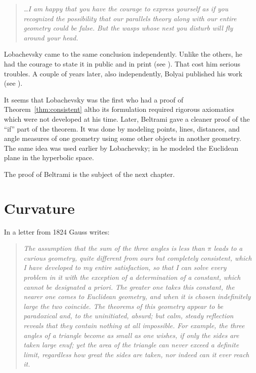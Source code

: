\smallskip

\begin{quotation}{\it
\dots I am happy that you have the courage to express yourself as if you recognized the possibility
that our parallels theory along with our entire geometry could be false. But the wasps whose
nest you disturb will fly around your head.}
\end{quotation}

\smallskip

Lobachevsky came to the same conclusion independently.
Unlike the others, he had the courage to state it in public and in print (see \cite{lobachevsky}).
That cost him serious troubles.
A couple of years later, also independently, Bolyai published his work (see \cite{bolyai}).

It seems that Lobachevsky was the first who had a proof of Theorem~\ref{thm:consistent} altho its formulation required rigorous axiomatics which were not developed at his time.
Later, Beltrami gave a cleaner proof of the ``if'' part of the theorem.
It was done by modeling points, lines, distances, and angle measures of one geometry using some other objects in another geometry.
The same idea was used earlier by Lobachevsky; 
in \cite[\S34]{lobachevsky-1840} he modeled the Euclidean plane in the hyperbolic space.

The proof of Beltrami is the subject of the next chapter. 



\section*{Curvature}
In a letter from 1824 Gauss writes: 

\begin{quotation}{\it
The assumption that the sum of the three angles is less than $\pi$ leads to a curious geometry, 
quite different from ours but completely consistent, 
which I have developed to my entire satisfaction, 
so that I can solve every problem in it with the exception of a determination of a constant, which cannot be designated a priori. 
The greater one takes this constant, the nearer one comes to Euclidean geometry, 
and when it is chosen indefinitely large the two coincide.
The theorems of this geometry appear to be paradoxical and, 
to the uninitiated, absurd; but calm, steady reflection reveals that they contain nothing at all impossible. 
For example, the three angles of a triangle become as small as one wishes, if only the sides are taken large enuf; 
yet the area of the triangle can never exceed a definite limit, regardless how great the sides are taken, 
nor indeed can it ever reach it.}
\end{quotation} 

